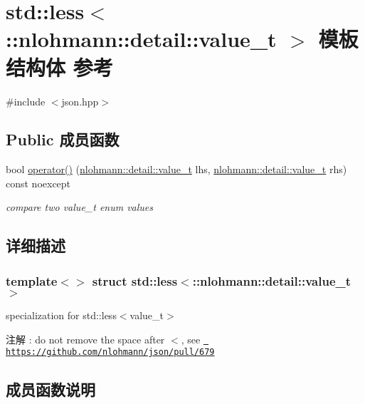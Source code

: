 \hypertarget{structstd_1_1less_3_1_1nlohmann_1_1detail_1_1value__t_01_4}{}\section{std\+::less$<$\+::nlohmann\+::detail\+::value\+\_\+t $>$ 模板结构体 参考}
\label{structstd_1_1less_3_1_1nlohmann_1_1detail_1_1value__t_01_4}


{\ttfamily \#include $<$json.\+hpp$>$}

\subsection*{Public 成员函数}
\begin{DoxyCompactItemize}
\item 
bool \mbox{\hyperlink{structstd_1_1less_3_1_1nlohmann_1_1detail_1_1value__t_01_4_a10d3fea50edf7b15ead8f4ceeb006000}{operator()}} (\mbox{\hyperlink{namespacenlohmann_1_1detail_a1ed8fc6239da25abcaf681d30ace4985}{nlohmann\+::detail\+::value\+\_\+t}} lhs, \mbox{\hyperlink{namespacenlohmann_1_1detail_a1ed8fc6239da25abcaf681d30ace4985}{nlohmann\+::detail\+::value\+\_\+t}} rhs) const noexcept
\begin{DoxyCompactList}\small\item\em compare two value\+\_\+t enum values \end{DoxyCompactList}\end{DoxyCompactItemize}


\subsection{详细描述}
\subsubsection*{template$<$$>$\newline
struct std\+::less$<$\+::nlohmann\+::detail\+::value\+\_\+t $>$}

specialization for std\+::less$<$value\+\_\+t$>$ \begin{DoxyNote}{注解}
\+: do not remove the space after \textquotesingle{}$<$\textquotesingle{}, see \href{https://github.com/nlohmann/json/pull/679}{\texttt{ https\+://github.\+com/nlohmann/json/pull/679}} 
\end{DoxyNote}


\subsection{成员函数说明}
\mbox{\label{structstd_1_1less_3_1_1nlohmann_1_1detail_1_1value__t_01_4_a10d3fea50edf7b15ead8f4ceeb006000}} 
